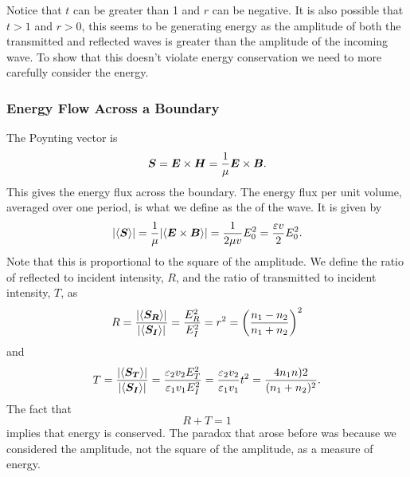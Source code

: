     Notice that \(t\) can be greater than 1 and \(r\) can be negative.
    It is also possible that \(t > 1\) and \(r > 0\), this seems to be generating energy as the amplitude of both the transmitted and reflected waves is greater than the amplitude of the incoming wave.
    To show that this doesn't violate energy conservation we need to more carefully consider the energy.
    
    \subsubsection{Energy Flow Across a Boundary}
    The Poynting vector is
    \[\bm{S} = \bm{E}\times\bm{H} = \frac{1}{\mu}\bm{E}\times \bm{B}.\]
    This gives the energy flux across the boundary.
    The energy flux per unit volume, averaged over one period, is what we define as the  of the wave.
    It is given by
    \[\abs{\langle{\bm{S}}\rangle} = \frac{1}{\mu}\abs{\langle{\bm{E}\times\bm{B}}\rangle} = \frac{1}{2\mu v}E_0^2 = \frac{\varepsilon v}{2}E_0^2.\]
    Note that this is proportional to the square of the amplitude.
    We define the ratio of reflected to incident intensity, \(R\), and the ratio of transmitted to incident intensity, \(T\), as
    \[R = \frac{\abs{\langle{\bm{S_R}}\rangle}}{\abs{\langle{\bm{S_I}}\rangle}} = \frac{E_R^2}{E_I^2} = r^2 = \left(\frac{n_1 - n_2}{n_1 + n_2}\right)^2\]
    and
    \[T = \frac{\abs{\langle{\bm{S_T}}\rangle}}{\abs{\langle{\bm{S_I}}\rangle}} = \frac{\varepsilon_2v_2E_T^2}{\varepsilon_1v_1E_I^2} = \frac{\varepsilon_2v_2}{\varepsilon_1v_1}t^2 = \frac{4n_1n)2}{(n_1 + n_2)^2}.\]
    The fact that
    \[R + T = 1\]
    implies that energy is conserved.
    The paradox that arose before was because we considered the amplitude, not the square of the amplitude, as a measure of energy.
    
